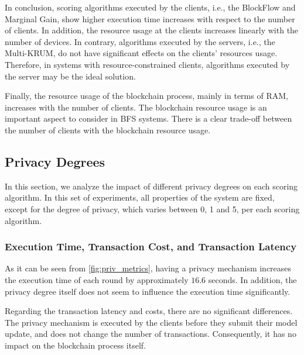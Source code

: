 In conclusion, scoring algorithms executed by the clients, i.e., the BlockFlow and Marginal Gain, show higher execution time increases with respect to the number of clients. In addition, the resource usage at the clients increases linearly with the number of devices. In contrary, algorithms executed by the servers, i.e., the Multi-KRUM, do not have significant effects on the clients' resources usage. Therefore, in systems with resource-constrained clients, algorithms executed by the server may be the ideal solution.

Finally, the resource usage of the blockchain process, mainly in terms of RAM, increases with the number of clients. The blockchain resource usage is an important aspect to consider in BFS systems. There is a clear trade-off between the number of clients with the blockchain resource usage.

\subsection{Privacy Degrees}

In this section, we analyze the impact of different privacy degrees on each scoring algorithm. In this set of experiments, all properties of the system are fixed, except for the degree of privacy, which varies between 0, 1 and 5, per each scoring algorithm.

\subsubsection{Execution Time, Transaction Cost, and Transaction Latency}

As it can be seen from \autoref{fig:priv_metrics}, having a privacy mechanism increases the execution time of each round by approximately $16.6$ seconds. In addition, the privacy degree itself does not seem to influence the execution time significantly.


Regarding the transaction latency and costs, there are no significant differences. The privacy mechanism is executed by the clients before they submit their model update, and does not change the number of transactions. Consequently, it has no impact on the blockchain process itself.


